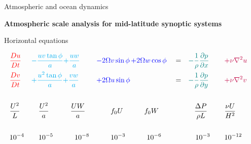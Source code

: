 \documentclass[aspectratio=169,xcolor=dvipsnames]{beamer}
\begin{document}
\begin{frame}[t]{Atmospheric and ocean dynamics}

\vspace{-1.0em}

\begin{center}
\textbf{{\large
Atmospheric scale analysis for mid-latitude synoptic systems
}}
\end{center}

\small 
\center 

\vspace{-0.5em}

Horizontal equations

\begin{align*}
    &\textcolor{red}{    \frac{Du}{Dt}   }&
    &\textcolor{cyan}{   - \frac{uv \tan\phi}{a} }
     \textcolor{cyan}{  + \frac{uw}{a}  }& 
    & \textcolor{blue}{   - 2\Omega v \sin\phi }
     \textcolor{blue}{  \,+ 2\Omega w \cos\phi }&
    & = &
    &\textcolor{teal}{   -\frac{1}{\rho}\frac{\partial p}{\partial x}  }&
    & \textcolor{purple}{\quad + \nu \nabla^2 u }&
    \\
    &\textcolor{red}{    \frac{Dv}{Dt}   } &
    &\textcolor{cyan}{   + \frac{u^2 \tan\phi}{a} }
     \textcolor{cyan}{  + \frac{vw}{a}     }&
    & \textcolor{blue}{   + 2\Omega u \sin\phi    }&
    & = &
    &\textcolor{teal}{   -\frac{1}{\rho}\frac{\partial p}{\partial y}  }&
    & \textcolor{purple}{\quad + \nu \nabla^2 v }&
    \\ \\
      &\textcolor{black}{ \frac{U^2}{L}  }&
      &\textcolor{black}{ \quad \frac{U^2}{a} }
       \textcolor{black}{\quad\quad\quad\frac{UW}{a} }&
      &\textcolor{black}{ \quad\quad f_0 U      }
       \textcolor{black}{\quad\quad\quad f_0 W  }&
      &&
      &\textcolor{black}{ \,\,\,\,\,\frac{\Delta P}{\rho L}  }&
      &\textcolor{black}{ \quad\frac{\nu U}{H^2} }&
    \\ \\
      &\textcolor{black}{ 10^{-4} }&
      &\textcolor{black}{  \quad10^{-5} }
       \textcolor{black}{ \quad\quad\quad 10^{-8}  }&
      &\textcolor{black}{  \quad\quad10^{-3}        }
       \textcolor{black}{ \quad\quad\quad 10^{-6} }&
      &&
      &\textcolor{black}{ \quad10^{-3}  }&
      &\textcolor{black}{ \quad10^{-12} }&
\end{align*}

\end{frame}
\end{document}
